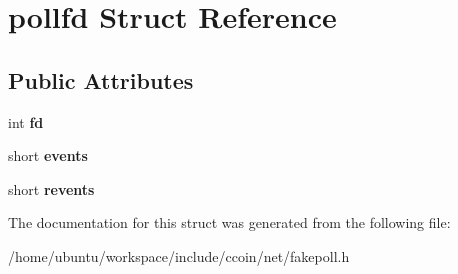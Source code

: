 \hypertarget{structpollfd}{\section{pollfd Struct Reference}
\label{structpollfd}
}
\subsection*{Public Attributes}
\begin{DoxyCompactItemize}
\item 
\hypertarget{structpollfd_a57e1c316fb063e468d680b6246147861}{int {\bfseries fd}}\label{structpollfd_a57e1c316fb063e468d680b6246147861}

\item 
\hypertarget{structpollfd_ac9b2f2c5b1f9a7487eb57e67cd4960ef}{short {\bfseries events}}\label{structpollfd_ac9b2f2c5b1f9a7487eb57e67cd4960ef}

\item 
\hypertarget{structpollfd_aafb457d11cac415faf0e1e2b825118c2}{short {\bfseries revents}}\label{structpollfd_aafb457d11cac415faf0e1e2b825118c2}

\end{DoxyCompactItemize}


The documentation for this struct was generated from the following file\-:\begin{DoxyCompactItemize}
\item 
/home/ubuntu/workspace/include/ccoin/net/fakepoll.\-h\end{DoxyCompactItemize}
